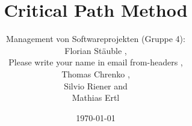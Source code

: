 \documentclass[12pt,a4paper,titlepage,oneside,openany]{article}
\title{Critical Path Method}
\date{\today}
\author{
	Management von Softwareprojekten (Gruppe 4):\\
	Florian St\"auble \email{e0415588@student.tuwien.ac.at},\\
	Please write your name in email from-headers \email{e0716649@student.tuwien.ac.at},\\
	Thomas Chrenko \email{thomas@chrenko.at},\\
	Silvio Riener \email{silvio@riener.ws} and\\
	Mathias Ertl \email{e0326788@student.tuwien.ac.at}
	}
\begin{document}
\maketitle
\begin{abstract}
\end{abstract}
\tableofcontents








\end{document}
